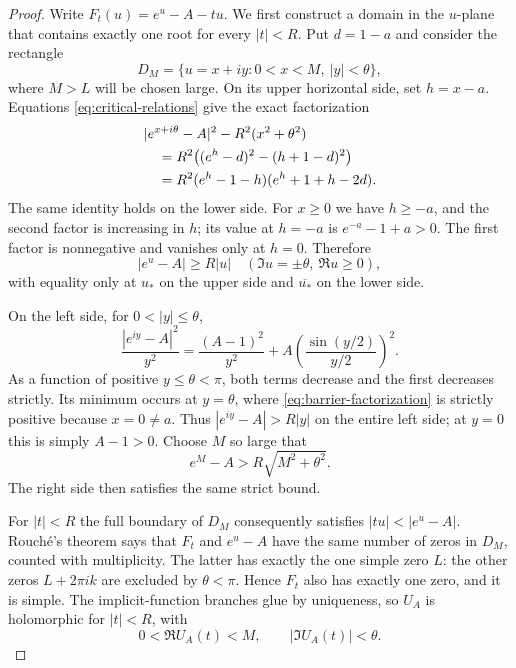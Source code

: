 \documentclass[11pt]{article}
\numberwithin{equation}{section}
\theoremstyle{definition}
\theoremstyle{remark}
\begin{document}
\begin{proof}
Write $F_t(u)=e^u-A-tu$.  We first construct a domain in the $u$-plane
that contains exactly one root for every $|t|<R$.  Put $d=1-a$ and
consider the rectangle
\[
 D_M=\{u=x+iy:0<x<M,\ |y|<\theta\},
\]
where $M>L$ will be chosen large.  On its upper horizontal side, set
$h=x-a$.  Equations \eqref{eq:critical-relations} give the exact
factorization
\begin{align}
 &|e^{x+i\theta}-A|^2-R^2(x^2+\theta^2)\notag\\
 &\quad=R^2\bigl((e^h-d)^2-(h+1-d)^2\bigr)\notag\\
 &\quad=R^2(e^h-1-h)(e^h+1+h-2d).
                         \label{eq:barrier-factorization}
\end{align}
The same identity holds on the lower side.  For $x\geq0$ we have
$h\geq-a$, and the second factor is increasing in $h$; its value at
$h=-a$ is $e^{-a}-1+a>0$.  The first factor is nonnegative and vanishes
only at $h=0$.  Therefore
\begin{equation}\label{eq:horizontal-bound}
 |e^u-A|\geq R|u|\quad(\Im u=\pm\theta,\ \Re u\geq0),
\end{equation}
with equality only at $u_*$ on the upper side and $\overline{u_*}$ on
the lower side.

On the left side, for $0<|y|\leq\theta$,
\begin{equation}\label{eq:vertical-bound-formula}
 \frac{|e^{iy}-A|^2}{y^2}
   =\frac{(A-1)^2}{y^2}
      +A\left(\frac{\sin(y/2)}{y/2}\right)^2.
\end{equation}
As a function of positive $y\leq\theta<\pi$, both terms decrease and
the first decreases strictly.  Its minimum occurs at $y=\theta$,
where \eqref{eq:barrier-factorization} is strictly positive because
$x=0\neq a$.  Thus $|e^{iy}-A|>R|y|$ on the entire left side; at
$y=0$ this is simply $A-1>0$.  Choose $M$ so large that
\[
 e^M-A>R\sqrt{M^2+\theta^2}.
\]
The right side then satisfies the same strict bound.

For $|t|<R$ the full boundary of $D_M$ consequently satisfies
$|tu|<|e^u-A|$.  Rouch\'e's theorem says that $F_t$ and $e^u-A$ have
the same number of zeros in $D_M$, counted with multiplicity.  The
latter has exactly the one simple zero $L$: the other zeros
$L+2\pi ik$ are excluded by $\theta<\pi$.  Hence $F_t$ also has exactly
one zero, and it is simple.  The implicit-function branches glue by
uniqueness, so $U_A$ is holomorphic for $|t|<R$, with
\begin{equation}\label{eq:root-strip}
 0<\Re U_A(t)<M,\qquad |\Im U_A(t)|<\theta.
\end{equation}


\end{proof}
\end{document}
